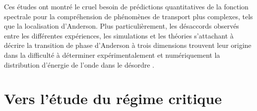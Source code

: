 Ces études ont montré le cruel besoin de prédictions quantitatives de la fonction spectrale pour la compréhension de phénomènes de transport plus complexes, tels que la localisation d'Anderson. Plus particulièrement, les désaccords observés entre les différentes expériences, les simulations et les théories s'attachant à décrire la transition de phase d'Anderson à trois dimensions trouvent leur origine dans la difficulté à déterminer expérimentalement et numériquement la distribution d'énergie de l'onde dans le désordre \citep{pasek2017anderson}.









\section{Vers l'étude du régime critique}



